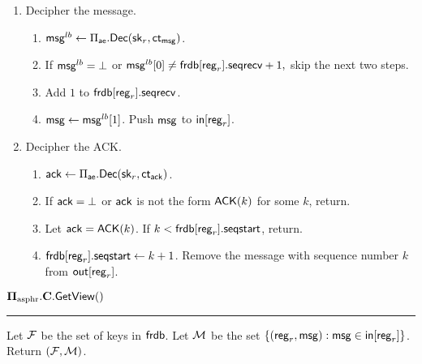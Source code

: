 \begin{definition}
\begin{enumerate}
    \item Decipher the message.
    \begin{enumerate}
        \item $\mathsf{msg}^{lb} \leftarrow \Pi_{\mathsf{ae}}.\mathsf{Dec}({\mathsf{sk}}_{r}, \mathsf{ct}_{\mathsf{msg}})$.
        \item If $\mathsf{msg}^{lb} = \bot$ or $\mathsf{msg}^{lb}[0] \neq \mathsf{frdb}[\mathsf{reg}_r].\mathsf{seqrecv} + 1,$
        skip the next two steps.
        \item Add $1$ to $\mathsf{frdb}[\mathsf{reg}_r].\mathsf{seqrecv}$. 
        \item $\mathsf{msg} \leftarrow \mathsf{msg}^{lb}[1]$. Push $\mathsf{msg}$ to $\mathsf{in}[\mathsf{reg}_r]$.
    \end{enumerate}
    \item Decipher the ACK.
    \begin{enumerate}
        \item $\mathsf{ack} \leftarrow \Pi_{\mathsf{ae}}.\mathsf{Dec}({\mathsf{sk}}_{r}, \mathsf{ct}_{\mathsf{ack}})$.
        \item If $\mathsf{ack} = \bot$ or $\mathsf{ack}$ is not the form $\mathsf{ACK}(k)$ for some $k$, return.
        \item Let $\mathsf{ack} = \mathsf{ACK}(k)$. If $k < \mathsf{frdb}[\mathsf{reg}_r].\mathsf{seqstart}$, return.
        \item $\mathsf{frdb}[\mathsf{reg}_r].\mathsf{seqstart} \leftarrow k + 1$. Remove the message with sequence number $k$ from $\mathsf{out}[\mathsf{reg}_r]$.
    \end{enumerate}
\end{enumerate}
\vspace{10pt}
$\mathbf{\Pi_{\text{asphr}}.C.\mathsf{GetView}}()$
\vspace{5pt}
\hrule
\vspace{5pt}
Let $\mathcal{F}$ be the set of keys in $\mathsf{frdb}$. Let $\mathcal{M}$ be the set $\{(\mathsf{reg}_r, \mathsf{msg}): \mathsf{msg} \in \mathsf{in}[\mathsf{reg}_r]\}$. Return $(\mathcal{F}, \mathcal{M})$.

\end{definition}